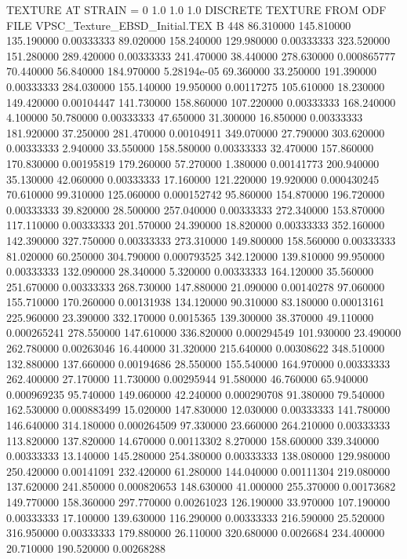 TEXTURE AT STRAIN = 0
1.0   1.0   1.0
DISCRETE TEXTURE FROM ODF FILE VPSC_Texture\RD_EBSD_Initial.TEX
B 448
86.310000	145.810000	135.190000	0.00333333
89.020000	158.240000	129.980000	0.00333333
323.520000	151.280000	289.420000	0.00333333
241.470000	38.440000	278.630000	0.000865777
70.440000	56.840000	184.970000	5.28194e-05
69.360000	33.250000	191.390000	0.00333333
284.030000	155.140000	19.950000	0.00117275
105.610000	18.230000	149.420000	0.00104447
141.730000	158.860000	107.220000	0.00333333
168.240000	4.100000	50.780000	0.00333333
47.650000	31.300000	16.850000	0.00333333
181.920000	37.250000	281.470000	0.00104911
349.070000	27.790000	303.620000	0.00333333
2.940000	33.550000	158.580000	0.00333333
32.470000	157.860000	170.830000	0.00195819
179.260000	57.270000	1.380000	0.00141773
200.940000	35.130000	42.060000	0.00333333
17.160000	121.220000	19.920000	0.000430245
70.610000	99.310000	125.060000	0.000152742
95.860000	154.870000	196.720000	0.00333333
39.820000	28.500000	257.040000	0.00333333
272.340000	153.870000	117.110000	0.00333333
201.570000	24.390000	18.820000	0.00333333
352.160000	142.390000	327.750000	0.00333333
273.310000	149.800000	158.560000	0.00333333
81.020000	60.250000	304.790000	0.000793525
342.120000	139.810000	99.950000	0.00333333
132.090000	28.340000	5.320000	0.00333333
164.120000	35.560000	251.670000	0.00333333
268.730000	147.880000	21.090000	0.00140278
97.060000	155.710000	170.260000	0.00131938
134.120000	90.310000	83.180000	0.00013161
225.960000	23.390000	332.170000	0.0015365
139.300000	38.370000	49.110000	0.000265241
278.550000	147.610000	336.820000	0.000294549
101.930000	23.490000	262.780000	0.00263046
16.440000	31.320000	215.640000	0.00308622
348.510000	132.880000	137.660000	0.00194686
28.550000	155.540000	164.970000	0.00333333
262.400000	27.170000	11.730000	0.00295944
91.580000	46.760000	65.940000	0.000969235
95.740000	149.060000	42.240000	0.000290708
91.380000	79.540000	162.530000	0.000883499
15.020000	147.830000	12.030000	0.00333333
141.780000	146.640000	314.180000	0.000264509
97.330000	23.660000	264.210000	0.00333333
113.820000	137.820000	14.670000	0.00113302
8.270000	158.600000	339.340000	0.00333333
13.140000	145.280000	254.380000	0.00333333
138.080000	129.980000	250.420000	0.00141091
232.420000	61.280000	144.040000	0.00111304
219.080000	137.620000	241.850000	0.000820653
148.630000	41.000000	255.370000	0.00173682
149.770000	158.360000	297.770000	0.00261023
126.190000	33.970000	107.190000	0.00333333
17.100000	139.630000	116.290000	0.00333333
216.590000	25.520000	316.950000	0.00333333
179.880000	26.110000	320.680000	0.0026684
234.400000	20.710000	190.520000	0.00268288
